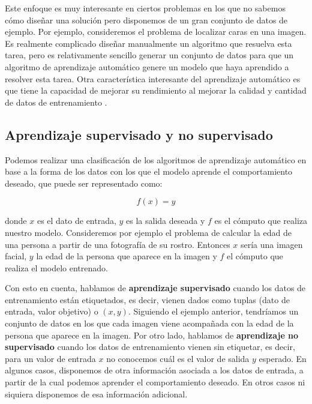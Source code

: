 Este enfoque es muy interesante en ciertos problemas en los que no sabemos cómo diseñar una solución pero disponemos de un gran conjunto de datos de ejemplo. Por ejemplo, consideremos el problema de localizar caras en una imagen. Es realmente complicado diseñar manualmente un algoritmo que resuelva esta tarea, pero es relativamente sencillo generar un conjunto de datos para que un algoritmo de aprendizaje automático genere un modelo que haya aprendido a resolver esta tarea. Otra característica interesante del aprendizaje automático es que tiene la capacidad de mejorar su rendimiento al mejorar la calidad y cantidad de datos de entrenamiento \cite{informatica:paper_que_es_ml}.

\subsection{Aprendizaje supervisado y no supervisado}

Podemos realizar una clasificación de los algoritmos de aprendizaje automático en base a la forma de los datos con los que el modelo aprende el comportamiento deseado, que puede ser representado como:

\begin{equation}
    f(x) = y
\end{equation}

donde $x$ es el dato de entrada, $y$ es la salida deseada y $f$ es el cómputo que realiza nuestro modelo. Consideremos por ejemplo el problema de calcular la edad de una persona a partir de una fotografía de su rostro. Entonces $x$ sería una imagen facial, $y$ la edad de la persona que aparece en la imagen y $f$ el cómputo que realiza el modelo entrenado.

Con esto en cuenta, hablamos de \textbf{aprendizaje supervisado} cuando los datos de entrenamiento están etiquetados, es decir, vienen dados como tuplas (dato de entrada, valor objetivo) o $(x, y)$. Siguiendo el ejemplo anterior, tendríamos un conjunto de datos en los que cada imagen viene acompañada con la edad de la persona que aparece en la imagen. Por otro lado, hablamos de \textbf{aprendizaje no supervisado} cuando los datos de entrenamiento vienen sin etiquetar, es decir, para un valor de entrada $x$ no conocemos cuál es el valor de salida $y$ esperado. En algunos casos, disponemos de otra información asociada a los datos de entrada, a partir de la cual podemos aprender el comportamiento deseado. En otros casos ni siquiera disponemos de esa información adicional.

